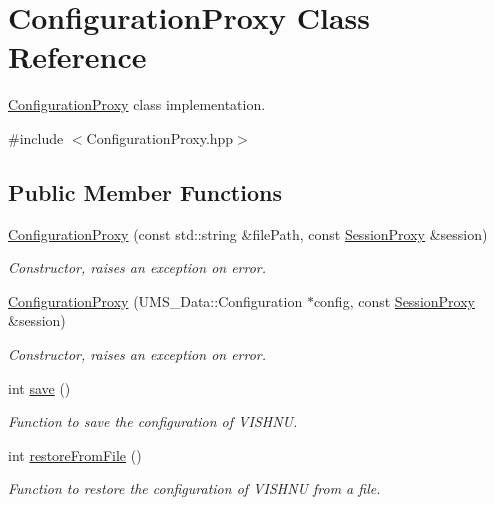 \hypertarget{classConfigurationProxy}{
\section{ConfigurationProxy Class Reference}
\label{classConfigurationProxy}
}


\hyperlink{classConfigurationProxy}{ConfigurationProxy} class implementation.  




{\ttfamily \#include $<$ConfigurationProxy.hpp$>$}

\subsection*{Public Member Functions}
\begin{DoxyCompactItemize}
\item 
\hyperlink{classConfigurationProxy_ad017715ce1a21c5c552a12214890ae03}{ConfigurationProxy} (const std::string \&filePath, const \hyperlink{classSessionProxy}{SessionProxy} \&session)
\begin{DoxyCompactList}\small\item\em Constructor, raises an exception on error. \item\end{DoxyCompactList}\item 
\hyperlink{classConfigurationProxy_a43efe8fc92cd6fa8bf44528b689654c6}{ConfigurationProxy} (UMS\_\-Data::Configuration $\ast$config, const \hyperlink{classSessionProxy}{SessionProxy} \&session)
\begin{DoxyCompactList}\small\item\em Constructor, raises an exception on error. \item\end{DoxyCompactList}\item 
int \hyperlink{classConfigurationProxy_a2650b17f6673f1b283ff45f617b40e6c}{save} ()
\begin{DoxyCompactList}\small\item\em Function to save the configuration of VISHNU. \item\end{DoxyCompactList}\item 
int \hyperlink{classConfigurationProxy_a2f680f79eebe3969b5b5669908682ff0}{restoreFromFile} ()
\begin{DoxyCompactList}\small\item\em Function to restore the configuration of VISHNU from a file. \item\end{DoxyCompactList}\item 

\end{DoxyCompactItemize}
